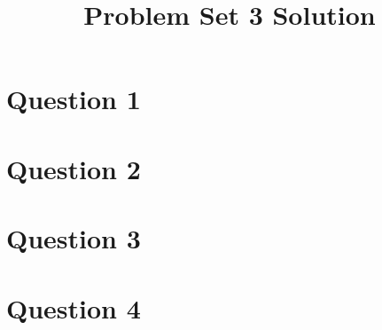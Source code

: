 \documentclass[12pt]{article}
\begin{document}
\title{Problem Set 3 Solution}
\maketitle

\section*{Question 1}

\section*{Question 2}

\section*{Question 3}

\section*{Question 4}
\end{document}
